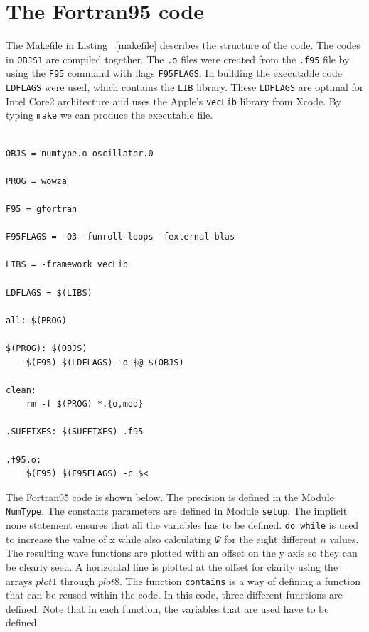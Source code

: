 \documentclass[12pt]{article}
\begin{document}
\section{The Fortran95 code}

The Makefile in Listing \ \ref{makefile} describes the structure of the code. The codes in {\tt OBJS1} are 
compiled together. The {\tt .o} files were created from the {\tt .f95} file by using the {\tt F95} command
with flags {\tt F95FLAGS}. In building the executable code {\tt LDFLAGS} were used, which contains 
the {\tt LIB} library. These {\tt LDFLAGS} are optimal for Intel Core2 architecture and uses the 
Apple's {\tt vecLib} library from Xcode. By typing {\tt make} we can produce the executable file.





\begin{lstlisting}[frame=single,caption={The {\tt Makefile}},label=makefile]

OBJS = numtype.o oscillator.0 

PROG = wowza

F95 = gfortran

F95FLAGS = -O3 -funroll-loops -fexternal-blas

LIBS = -framework vecLib

LDFLAGS = $(LIBS)

all: $(PROG) 

$(PROG): $(OBJS)
	$(F95) $(LDFLAGS) -o $@ $(OBJS) 

clean:
	rm -f $(PROG) *.{o,mod}

.SUFFIXES: $(SUFFIXES) .f95

.f95.o:
	$(F95) $(F95FLAGS) -c $<

\end{lstlisting}

The Fortran95 code is shown below. The precision is defined in the Module {\tt NumType}. The constants parameters are defined in Module {\tt setup}. The implicit none statement ensures that all the variables has to be defined. {\tt do while} is used to increase the value of x while also calculating $\Psi$ for the eight different $n$ values. The resulting wave functions are plotted with an offset on the y axis so they can be clearly seen. A horizontal line is plotted at the offset for clarity using the arrays $plot1$ through $plot8$. The function {\tt contains} is a way of defining a function that can be reused within the code. In this code, three different functions are defined. Note that in each function, the variables that are used have to be defined.   
\end{document}
